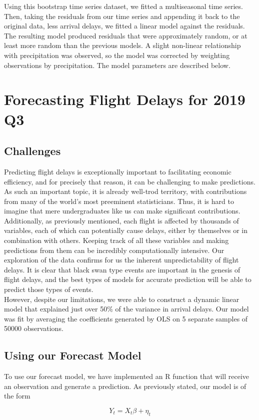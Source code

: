 \documentclass[12pt, a4paper, openany]{book}
\newcommand\tab[1][1cm]{\hspace*{#1}}
\begin{document}
	\tab Using this bootstrap time series dataset, we fitted a multiseasonal time series. Then, taking the residuals from our time series and appending it back to the original data, less arrival delays, we fitted a linear model against the residuals. The resulting model produced residuals that were approximately random, or at least more random than the previous models. A slight non-linear relationship with precipitation was observed, so the model was corrected by weighting observations by precipitation. The model parameters are described below.\\


	
\chapter{Forecasting Flight Delays for 2019 Q3}
	\section{Challenges}
	\tab Predicting flight delays is exceptionally important to facilitating economic efficiency, and for precisely that reason, it can be challenging to make predictions. As such an important topic, it is already well-trod territory, with contributions from many of the world's most preeminent statisticians. Thus, it is hard to imagine that mere undergraduates like us can make significant contributions. Additionally, as previously mentioned, each flight is affected by thousands of variables, each of which can potentially cause delays, either by themselves or in combination with others. Keeping track of all these variables and making predictions from them can be incredibly computationally intensive. Our exploration of the data confirms for us the inherent unpredictability of flight delays. It is clear that black swan type events are important in the genesis of flight delays, and the best types of models for accurate prediction will be able to predict those types of events. \\
	\tab However, despite our limitations, we were able to construct a dynamic linear model that explained just over 50\% of the variance in arrival delays. Our model was fit by averaging the coefficients generated by OLS on 5 separate samples of 50000 observations. 
	\section{Using our Forecast Model}
	\tab To use our forecast model, we have implemented an R function that will receive an observation and generate a prediction. As previously stated, our model is of the form \begin{center}
	$$Y_t = X_t\beta + \eta_t$$
	\end{center} 
\end{document}
